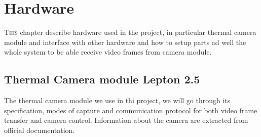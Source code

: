 \chapter{Hardware}
\label{chap:}
\lettrine[lines=3]{T}{his} chapter describe hardware used in
the project, in particular thermal camera module and interface with other
hardware and how to setup parts ad well the whole system to be able receive
video frames from camera module.

\section{Thermal Camera module Lepton 2.5}
\label{sec:}
The thermal camera module we use in thi project, we will go through its
specification, modes of capture and communication protocol for both video frame
transfer and camera control. Information about the camera are extracted from
official documentation.




